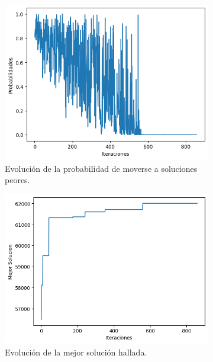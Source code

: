 \documentclass[a4paper,12pt]{article}
\begin{document}
\begin{figure}[H]
\begin{subfigure}{.45\textwidth}
			\includegraphics[width=\textwidth]{include/ultima_ejec/prob.png}
			\caption{Evolución de la probabilidad de moverse a soluciones peores. }
		\end{subfigure}
		\hfill
		\begin{subfigure}{.45\textwidth}
			\centering
			\includegraphics[width=\textwidth]{include/ultima_ejec/f_ast.png}
			\caption{Evolución de la mejor solución hallada. }
		\end{subfigure}
		\hfill
		\begin{subfigure}{.45\textwidth}
			\centering

\end{subfigure}
\end{figure}
\end{document}
